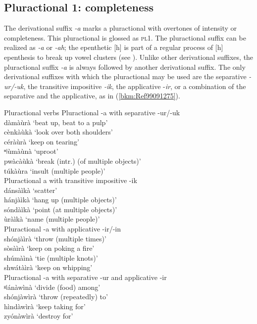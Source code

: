 \subsection{Pluractional 1: completeness}
\label{bkm:Ref70945678}\hypertarget{Toc75352665}{}
The derivational suffix \textit{-a} marks a pluractional with overtones of intensity or completeness. This pluractional is glossed as \textsc{pl}1. The pluractional suffix can be realized as \textit{-a} or \textit{-ah}; the epenthetic [h] is part of a regular process of [h] epenthesis to break up vowel clusters (see ). Unlike other derivational suffixes, the pluractional suffix \textit{-a} is always followed by another derivational suffix. The only derivational suffixes with which the pluractional may be used are the separative \textit{-ur/-uk}, the transitive impositive \textit{-ik}, the applicative \nobreakdash-\textit{ir}, or a combination of the separative and the applicative, as in (\ref{bkm:Ref99091275}).

\ea
\label{bkm:Ref99091275}
Pluractional verbs
\ea
Pluractional -a with separative -ur/-uk\\
dàmàùrà \tab ‘beat up, beat to a pulp’\\
cènkàùkà \tab ‘look over both shoulders’\\
céràùrà \tab ‘keep on tearing’\\
ⁿǀùmàùnà \tab ‘uproot’\\
pwàcàùkà \tab ‘break (intr.) (of multiple objects)’\\
túkàùra \tab ‘insult (multiple people)’\\
\ex Pluractional \-a with transitive impositive -ik\\
dánsàìkà \tab ‘scatter’\\
hánjàìkà \tab ‘hang up (multiple objects)’\\
sóndàìkà \tab ‘point (at multiple objects)’\\
ùràìkà \tab ‘name (multiple people)’\\
\ex Pluractional -a with applicative -ir/-in\\
shónjàìrà \tab ‘throw (multiple times)’\\
sòsàìrà \tab ‘keep on poking a fire’\\
shúmàìnà \tab ‘tie (multiple knots)’\\
shwátàìrà \tab ‘keep on whipping’\\
\ex Pluractional -a with separative -ur and applicative -ir\\
ᵍǀánàwìnà \tab ‘divide (food) among’\\
shónjàwìrà \tab ‘throw (repeatedly) to’\\
hìndàwìrà \tab ‘keep taking for’\\
zyónàwìrà \tab ‘destroy for’\\
\z\z


